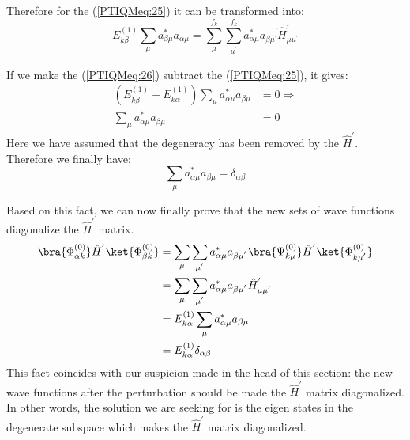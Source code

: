 Therefore for the (\ref{PTIQMeq:25}) it can be transformed into:
\begin{equation}\label{PTIQMeq:26}
E^{(1)}_{k\beta}\sum_{\mu}a_{\beta\mu}^{*}a_{\alpha\mu} =
\sum_{\mu}^{f_{k}}\sum_{\mu^{'}}^{f_{k}}a_{\alpha\mu}^{*}
a_{\beta\mu^{'}}\hat{H}^{'}_{\mu\mu^{'}}
\end{equation}

If we make the (\ref{PTIQMeq:26}) subtract the (\ref{PTIQMeq:25}),
it gives:
\begin{align}\label{}
(E^{(1)}_{k\beta} -
E^{(1)}_{k\alpha})\sum_{\mu}a_{\alpha\mu}^{*}a_{\beta\mu} &= 0
\Rightarrow\nonumber \\
\sum_{\mu}a_{\alpha\mu}^{*}a_{\beta\mu} &= 0
\end{align}
Here we have assumed that the degeneracy has been removed by the
$\hat{H}^{'}$. Therefore we finally have:
\begin{equation}\label{}
\sum_{\mu}a_{\alpha\mu}^{*}a_{\beta\mu} = \delta_{\alpha\beta}
\end{equation}

Based on this fact, we can now finally prove that the new sets of
wave functions diagonalize the $\hat{H}^{'}$ matrix.
\begin{align}\label{}
\bra{\Phi_{\alpha k}^{(0)}}\hat{H}^{'}\ket{\Phi_{\beta k}^{(0)}} &=
\sum_{\mu}\sum_{\mu^{'}}a_{\alpha\mu}^{*}
a_{\beta\mu^{'}}\bra{\Psi_{k\mu}^{(0)}}\hat{H}^{'}
\ket{\Phi_{k\mu^{'}}^{(0)}} \nonumber \\
&= \sum_{\mu}\sum_{\mu^{'}}a_{\alpha\mu}^{*}
a_{\beta\mu^{'}}\hat{H}^{'}_{\mu\mu^{'}} \nonumber \\
&=E^{(1)}_{k\alpha}\sum_{\mu}a_{\alpha\mu}^{*}a_{\beta\mu} \nonumber \\
&=E^{(1)}_{k\alpha}\delta_{\alpha\beta}
\end{align}
This fact coincides with our suspicion made in the head of this
section: the new wave functions after the perturbation should be
made the $\hat{H}^{'}$ matrix diagonalized. In other words, the
solution we are seeking for is the eigen states in the degenerate
subspace which makes the $\hat{H}^{'}$ matrix diagonalized.

